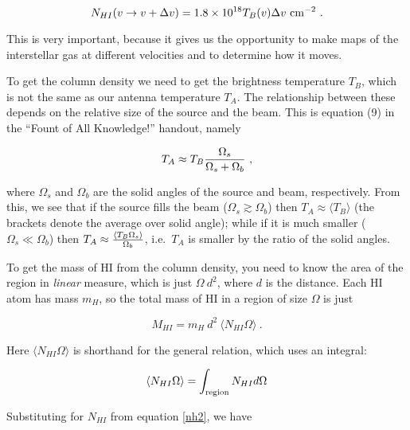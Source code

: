 \documentclass[psfig,preprint]{aastex}
\begin{document}
\begin{equation} \label{nh2}
N_{HI}(v \rightarrow v + \Delta v) = 1.8 \times 10^{18} T_{B}(v) \Delta
v \ {\rm cm^{-2}} \ .  
\end{equation}

\noindent This is very important, because it gives us the opportunity to
make maps of the interstellar gas at different velocities and to
determine how it moves.

	To get the column density we need to get the brightness
temperature $T_B$, which is not the same as our antenna temperature
$T_A$. The relationship between these depends on the relative size of
the source and the beam. This is equation (9) in the ``Fount of All
Knowledge!'' handout, namely 

\begin{equation} \label{taeqn}
T_A \approx T_B {\Omega_s \over \Omega_s + \Omega_b} \ ,
\end{equation}

\noindent where $\Omega_s$ and $\Omega_b$ are the solid angles of the
source and beam, respectively. From this, we see that if the source
fills the beam ($\Omega_s \gtrsim \Omega_b$) then $T_A \approx \langle
T_B\rangle$ (the brackets denote the average over solid angle);
while if it is much smaller ($\Omega_s \ll \Omega_b$) then $T_A \approx
{\langle T_B \Omega_s\rangle \over \Omega_b}$, i.e.\ $T_A$ is smaller by the ratio of
the solid angles. 

	To get the mass of HI from the column density, you need to know
the area of the region in {\it linear} measure, which is just $\Omega \
d^2$, where $d$ is the distance.  Each HI atom has mass $m_H$, so the
total mass of HI in a region of size $\Omega$ is just

\begin{mathletters} \label{masseqn}
\begin{equation} 
M_{HI} = m_H \ d^2 \ \langle N_{HI} \Omega\rangle \ .
\end{equation}

\noindent Here $\langle N_{HI} \Omega \rangle$ is shorthand for the
general relation, which uses an integral:

\begin{equation}
\langle N_{HI} \Omega \rangle = \int_{\rm region} N_{HI} d \Omega
\end{equation}
\end{mathletters}

\noindent Substituting for $N_{HI}$ from equation \ref{nh2}, we have
\end{document}
